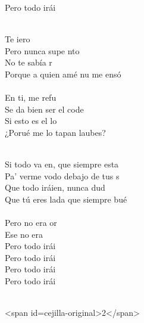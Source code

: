 \begin{cancion}
\begin{chorus}
	Pero todo irái \\
	\end{chorus}%
	\jump\\
	Te iero\\
	Pero nunca supe nto \\
	No te sabía r\\
	Porque a quien amé nu me ensó \\
\jump\\
	En ti, me refu \\
	Se  da bien ser el code  \\
	Si esto es el lo\\
	¿Porué me lo tapan laubes?\\\jump\\
	\begin{chorus}%
	Si todo va en, que siempre esta\\
	Pa' verme vodo debajo de tus s\\
	Que todo iráien, nunca dud \\
	Que tú eres lada que siempre bué\\
\jump\\
	Pero no era or\\
	Ese no era \\
	Pero todo irái \\
	Pero todo irái \\
	Pero todo irái \\
	Pero todo irái \\
	\end{chorus}%
	\jump\\
<span id=cejilla-original>2</span>\\
\end{cancion}%

